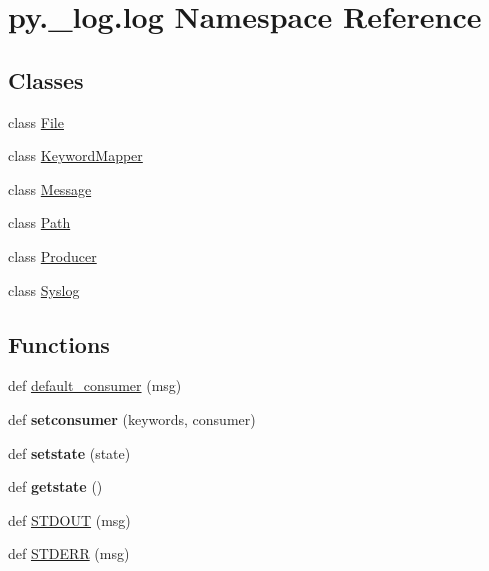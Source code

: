 \hypertarget{namespacepy_1_1__log_1_1log}{}\section{py.\+\_\+log.\+log Namespace Reference}
\label{namespacepy_1_1__log_1_1log}
\subsection*{Classes}
\begin{DoxyCompactItemize}
\item 
class \hyperlink{classpy_1_1__log_1_1log_1_1_file}{File}
\item 
class \hyperlink{classpy_1_1__log_1_1log_1_1_keyword_mapper}{Keyword\+Mapper}
\item 
class \hyperlink{classpy_1_1__log_1_1log_1_1_message}{Message}
\item 
class \hyperlink{classpy_1_1__log_1_1log_1_1_path}{Path}
\item 
class \hyperlink{classpy_1_1__log_1_1log_1_1_producer}{Producer}
\item 
class \hyperlink{classpy_1_1__log_1_1log_1_1_syslog}{Syslog}
\end{DoxyCompactItemize}
\subsection*{Functions}
\begin{DoxyCompactItemize}
\item 
def \hyperlink{namespacepy_1_1__log_1_1log_a1057ab2ad3a0224ea93a79d090bde3bd}{default\+\_\+consumer} (msg)
\item 
\mbox{\label{namespacepy_1_1__log_1_1log_a13a8784f72b786391fd63562bcd303b5}} 
def {\bfseries setconsumer} (keywords, consumer)
\item 
\mbox{\label{namespacepy_1_1__log_1_1log_ac167fddbf461d9e0e41ecf042bdb5856}} 
def {\bfseries setstate} (state)
\item 
\mbox{\label{namespacepy_1_1__log_1_1log_a46015b75230f5022d180d5b3f7beadee}} 
def {\bfseries getstate} ()
\item 
def \hyperlink{namespacepy_1_1__log_1_1log_a6046f594a3d2b2ad0e7023ff5bfd72ea}{S\+T\+D\+O\+UT} (msg)
\item 
def \hyperlink{namespacepy_1_1__log_1_1log_a7519bc63315c0687184766ebfe36ab3d}{S\+T\+D\+E\+RR} (msg)
\end{DoxyCompactItemize}
